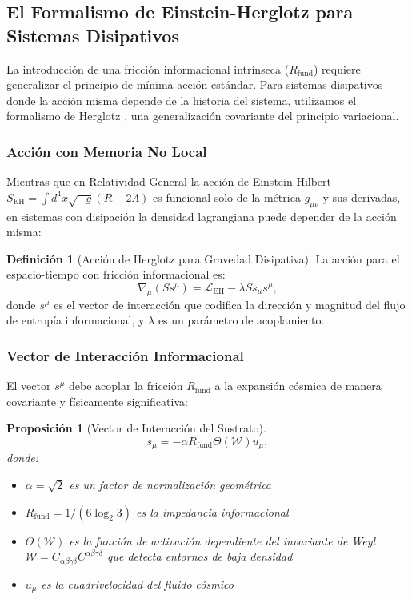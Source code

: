 \documentclass[11pt, a4paper]{article}
\theoremstyle{plain}
\newtheorem{proposicion}[teorema]{Proposición}
\theoremstyle{definition}
\newtheorem{definicion}[teorema]{Definición}
\newcommand{\Rfactor}{R_{\text{fund}}}
\begin{document}
\subsection{El Formalismo de Einstein-Herglotz para Sistemas Disipativos}

La introducción de una fricción informacional intrínseca ($\Rfactor$) requiere generalizar el principio de mínima acción estándar. Para sistemas disipativos donde la acción misma depende de la historia del sistema, utilizamos el formalismo de Herglotz \cite{Herglotz1930}, una generalización covariante del principio variacional.

\subsubsection{Acción con Memoria No Local}

Mientras que en Relatividad General la acción de Einstein-Hilbert $S_{\text{EH}} = \int d^4x \sqrt{-g}(R - 2\Lambda)$ es funcional solo de la métrica $g_{\mu\nu}$ y sus derivadas, en sistemas con disipación la densidad lagrangiana puede depender de la acción misma:

\begin{definicion}[Acción de Herglotz para Gravedad Disipativa]
La acción para el espacio-tiempo con fricción informacional es:
\begin{equation}
\nabla_\mu (S s^\mu) = \mathcal{L}_{\text{EH}} - \lambda S s_\mu s^\mu,
\label{eq:herglotz_action}
\end{equation}
donde $s^\mu$ es el vector de interacción que codifica la dirección y magnitud del flujo de entropía informacional, y $\lambda$ es un parámetro de acoplamiento.
\end{definicion}

\subsubsection{Vector de Interacción Informacional}

El vector $s^\mu$ debe acoplar la fricción $\Rfactor$ a la expansión cósmica de manera covariante y físicamente significativa:

\begin{proposicion}[Vector de Interacción del Sustrato]
\begin{equation}
s_\mu = -\alpha \Rfactor \Theta(\mathcal{W}) u_\mu,
\label{eq:interaction_vector}
\end{equation}
donde:
\begin{itemize}
    \item $\alpha = \sqrt{2}$ es un factor de normalización geométrica
    \item $\Rfactor = 1/(6\log_2 3)$ es la impedancia informacional
    \item $\Theta(\mathcal{W})$ es la función de activación dependiente del invariante de Weyl $\mathcal{W} = C_{\alpha\beta\gamma\delta}C^{\alpha\beta\gamma\delta}$ que detecta entornos de baja densidad
    \item $u_\mu$ es la cuadrivelocidad del fluido cósmico
\end{itemize}
\end{proposicion}
\end{document}
